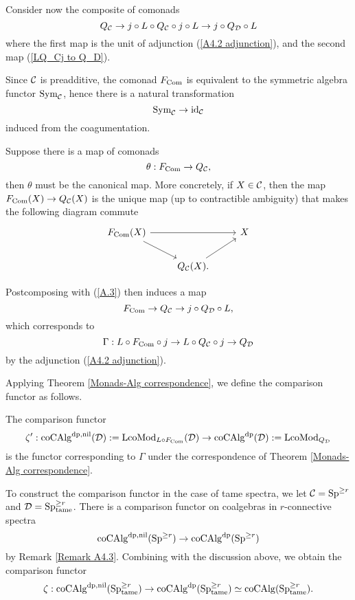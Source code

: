 Consider now the composite of comonads
\begin{equation}
\label{A.3}
    Q_{{\mathcal{C}}} \to 
   j\circ L \circ Q_{{\mathcal{C}}} \circ j\circ L
    \to 
    j\circ Q_{{\mathcal{D}}} \circ L
\end{equation}
where the first map is the unit of adjunction (\ref{A4.2 adjunction}), and the second map (\ref{LQ_Cj to Q_D}).

Since ${\mathcal{C}}$ is preadditive, the comonad $F_{\operatorname{Com}}$ is equivalent to the symmetric algebra functor $\operatorname{Sym}_{{\mathcal{C}}}$, hence there is a natural transformation
$$
\operatorname{Sym}_{{\mathcal{C}}} \to \operatorname{id}_{{\mathcal{C}}}
$$
induced from the coagumentation.

\begin{remark}
\label{F_Com to Q_C}
Suppose there is a map of comonads
$$
\theta: F_{\operatorname{Com}} \to 
Q_{{\mathcal{C}}},
$$
then $\theta$ must be the canonical map.
    More concretely, if $X\in {\mathcal{C}}$, then the map $F_{\operatorname{Com}}(X) \to 
Q_{{\mathcal{C}}}(X)$ is the unique map (up to contractible ambiguity) that makes the following diagram commute
\[
\begin{tikzcd}
	 F_{\Com}(X) &   & X \\
	& Q_{\CC}(X) .  &
	\arrow[from=1-1, to = 1-3]
	\arrow[from=1-1 , to =2-2]
	\arrow[from=2-2, to=1-3]
\end{tikzcd}
\]
\end{remark}


Postcomposing with (\ref{A.3}) then induces a map 
$$
F_{\operatorname{Com}}  \to 
Q_{{\mathcal{C}}}
\to 
j\circ Q_{{\mathcal{D}}} \circ L,
$$
which corresponds to 
$$
\Gamma: L\circ F_{\operatorname{Com}} \circ j \to L\circ Q_{{\mathcal{C}}} \circ j \to Q_{{\mathcal{D}}}
$$
by the adjunction (\ref{A4.2 adjunction}).

Applying Theorem \ref{Monads-Alg correspondence}, we define the comparison functor as follows.
\begin{definition}
    The comparison functor
    \[
    \zeta': \operatorname{coCAlg}^{\operatorname{dp},\operatorname{nil}}({\mathcal{D}}) :=\operatorname{LcoMod}_{L\circ F_{\operatorname{Com}}}({\mathcal{D}}) \to \operatorname{coCAlg}^{\operatorname{dp}}({\mathcal{D}}):=\operatorname{LcoMod}_{Q_{{\mathcal{D}}}}
    \]
    is the functor corresponding to $\Gamma$ under the correspondence of Theorem \ref{Monads-Alg correspondence}.
\end{definition}

To construct the comparison functor in the case of tame spectra, we let ${\mathcal{C}}=\operatorname{Sp}^{\geq r}$ and ${\mathcal{D}}=\operatorname{Sp}^{\geq r}_{\operatorname{\operatorname{tame}}}$. There is a comparison functor on coalgebras in $r$-connective spectra
$$
\operatorname{coCAlg}^{\operatorname{dp}, \operatorname{nil}}(\operatorname{Sp}^{\geq r}) \to  \operatorname{coCAlg}^{\operatorname{dp}}(\operatorname{Sp}^{\geq r})
$$
by Remark \ref{Remark A4.3}.
Combining with the discussion above, we obtain the comparison functor
\[
\zeta:\operatorname{coCAlg}^{\operatorname{dp},\operatorname{nil}}(\operatorname{Sp}^{\geq r}_{\operatorname{\operatorname{tame}}}) \to
\operatorname{coCAlg}^{\operatorname{dp}}(\operatorname{Sp}^{\geq r}_{\operatorname{\operatorname{tame}}})\simeq
\operatorname{coCAlg}(\operatorname{Sp}^{\geq r}_{\operatorname{\operatorname{tame}}}).
\]



